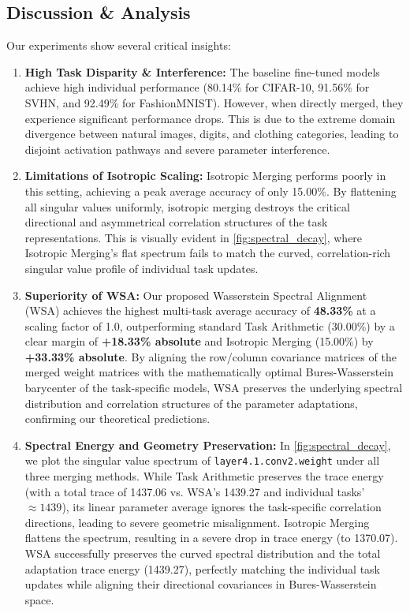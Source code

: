 \documentclass{article}
\theoremstyle{plain}
\theoremstyle{definition}
\theoremstyle{remark}
\begin{document}
\subsection{Discussion \& Analysis}
Our experiments show several critical insights:
\begin{enumerate}
  \item \textbf{High Task Disparity \& Interference:} The baseline fine-tuned models achieve high individual performance (80.14\% for CIFAR-10, 91.56\% for SVHN, and 92.49\% for FashionMNIST). However, when directly merged, they experience significant performance drops. This is due to the extreme domain divergence between natural images, digits, and clothing categories, leading to disjoint activation pathways and severe parameter interference.
  \item \textbf{Limitations of Isotropic Scaling:} Isotropic Merging performs poorly in this setting, achieving a peak average accuracy of only 15.00\%. By flattening all singular values uniformly, isotropic merging destroys the critical directional and asymmetrical correlation structures of the task representations. This is visually evident in \cref{fig:spectral_decay}, where Isotropic Merging's flat spectrum fails to match the curved, correlation-rich singular value profile of individual task updates.
  \item \textbf{Superiority of WSA:} Our proposed Wasserstein Spectral Alignment (WSA) achieves the highest multi-task average accuracy of \textbf{48.33\%} at a scaling factor of 1.0, outperforming standard Task Arithmetic (30.00\%) by a clear margin of \textbf{+18.33\% absolute} and Isotropic Merging (15.00\%) by \textbf{+33.33\% absolute}. By aligning the row/column covariance matrices of the merged weight matrices with the mathematically optimal Bures-Wasserstein barycenter of the task-specific models, WSA preserves the underlying spectral distribution and correlation structures of the parameter adaptations, confirming our theoretical predictions.
  \item \textbf{Spectral Energy and Geometry Preservation:} In \cref{fig:spectral_decay}, we plot the singular value spectrum of \texttt{layer4.1.conv2.weight} under all three merging methods. While Task Arithmetic preserves the trace energy (with a total trace of 1437.06 vs. WSA's 1439.27 and individual tasks' $\approx 1439$), its linear parameter average ignores the task-specific correlation directions, leading to severe geometric misalignment. Isotropic Merging flattens the spectrum, resulting in a severe drop in trace energy (to 1370.07). WSA successfully preserves the curved spectral distribution and the total adaptation trace energy (1439.27), perfectly matching the individual task updates while aligning their directional covariances in Bures-Wasserstein space.
\end{enumerate}
\end{document}
